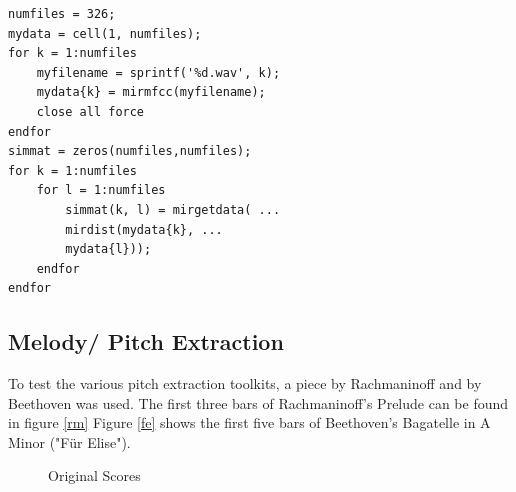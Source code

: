 \lstset{language=Matlab}          %
\FloatBarrier

\begin{lstlisting}[frame=single,label={lst:MIRmat},
caption={MIR Toolkit Similarity},captionpos=b]  % Start your code-block
numfiles = 326;
mydata = cell(1, numfiles);
for k = 1:numfiles
	myfilename = sprintf('%d.wav', k);
	mydata{k} = mirmfcc(myfilename);
	close all force
endfor
simmat = zeros(numfiles,numfiles);
for k = 1:numfiles
	for l = 1:numfiles
		simmat(k, l) = mirgetdata( ...
		mirdist(mydata{k}, ...
		mydata{l}));
	endfor
endfor
\end{lstlisting}
\FloatBarrier


\subsection{Melody/ Pitch Extraction}\label{midiest}
To test the various pitch extraction toolkits, a piece by Rachmaninoff and by Beethoven was used. The first three bars of Rachmaninoff's Prelude can be found in figure \ref{rm}
Figure \ref{fe} shows the first five bars of Beethoven's Bagatelle in A Minor ("Für Elise").
\begin{figure}[htbp]
	\centering
	\caption{Original Scores}
	\label{fig:sheets}
\end{figure}
